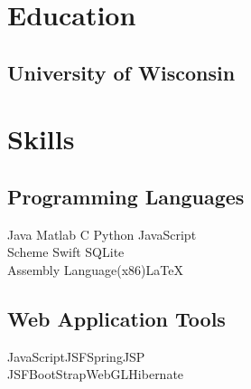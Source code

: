 \documentclass[]{deedy-resume-openfont}
\begin{document}
%
%
\lastupdated

%
%

%
%

\begin{minipage}[t]{0.32\textwidth} 


\section{Education} 

\subsection{University of Wisconsin}
\sectionsep





\section{Skills}
\subsection{Programming Languages}
Java \textbullet{} Matlab \textbullet{} C \textbullet{} Python \textbullet{} JavaScript\\ 
Scheme \textbullet{} Swift \textbullet{} SQLite 	\\
Assembly Language(x86)\textbullet{}\LaTeX\
\sectionsep

\subsection{Web Application Tools}
JavaScript\textbullet{}JSF\textbullet{}Spring\textbullet{}JSP\\
JSF\textbullet{}BootStrap\textbullet{}WebGL\textbullet{}Hibernate
\sectionsep


\end{minipage}
\end{document}
